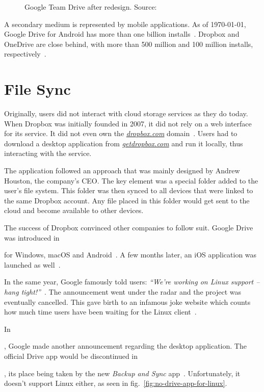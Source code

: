 \begin{figure}[bpt]
\caption{Google Team Drive after redesign. Source:~\cite{google_drive_ui_updates}}
\label{fig:drive-after}
\centering
{}
\end{figure}


A secondary medium is represented by mobile applications. As of \monthyeardate\today, Google Drive for Android has more than one billion installs~\cite{google_drive_android_app}. Dropbox and OneDrive are close behind, with more than 500 million and 100 million installs, respectively~\cite{dropbox_android_app,one_drive_android_app}.

\section{File Sync}

Originally, users did not interact with cloud storage services as they do today. When Dropbox was initially founded in 2007, it did not rely on a web interface for its service. It did not even own the \emph{\url{dropbox.com}} domain~\cite{dropbox_acquires_dropbox_dot_com}. Users had to download a desktop application from \emph{\url{getdropbox.com}} and run it locally, thus interacting with the service.

The application followed an approach that was mainly designed by Andrew Houston, the company's CEO. The key element was a special folder added to the user's file system. This folder was then synced to all devices that were linked to the same Dropbox account. Any file placed in this folder would get sent to the cloud and become available to other devices.

The success of Dropbox convinced other companies to follow suit. Google Drive was introduced in \date{April 2012} for Windows, macOS and Android~\cite{introducing_google_drive}. A few months later, an iOS application was launched as well~\cite{hands_on_with_the_google_drive_for_ios_app}.

In the same year, Google famously told users: \emph{``We're working on Linux support -- hang tight!''}~\cite{google_drive_for_linux_is_on_the_way}. The announcement went under the radar and the project was eventually cancelled. This gave birth to an infamous joke website which counts how much time users have been waiting for the Linux client~\cite{how_long_since_google_said_hang_tight}.

In \date{September 2017}, Google made another announcement regarding the desktop application. The official Drive app would be discontinued in \date{March 2018}, its place being taken by the new \emph{Backup and Sync} app~\cite{introducing_backup_and_sync,google_drive_is_being_replaced_by_backup_and_sync}. Unfortunately, it doesn't support Linux either, as seen in fig.~\ref{fig:no-drive-app-for-linux}.

